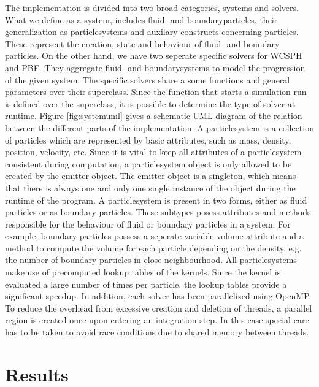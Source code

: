 \documentclass[11pt, letterpaper, twocolumn]{article}
\begin{document}
The implementation is divided into two broad categories, systems and solvers.
What we define as a system, includes fluid- and boundaryparticles, their generalization as particlesystems and auxilary constructs concerning particles. These represent the creation, state and behaviour of fluid- and boundary particles.
On the other hand, we have two seperate specific solvers for WCSPH and PBF. They aggregate fluid- and boundarysystems to model the progression of the given system. The specific solvers share a some functions and general parameters over their superclass. Since the function that starts a simulation run is defined over the superclass, it is possible to determine the type of solver at runtime.
Figure \ref{fig:systemuml} gives a schematic UML diagram of the relation between the different parts of the implementation.
A particlesystem is a collection of particles which are represented by basic attributes, such as mass, density, position, velocity, etc. Since it is vital to keep all attributes of a particlesystem consistent during computation, a particlesystem object is only allowed to be created by the emitter object. The emitter object is a singleton, which means that there is always one and only one single instance of the object during the runtime of the program. A particlesystem is present in two forms, either as fluid particles or as boundary particles. These subtypes posess attributes and methods responsible for the behaviour of fluid or boundary particles in a system. For example, boundary particles possess a seperate variable volume attribute and a method to compute the volume for each particle depending on the density, e.g. the number of boundary particles in close neighbourhood. All particlesystems make use of precomputed lookup tables of the kernels. Since the kernel is evaluated a large number of times per particle, the lookup tables provide a significant speedup.
In addition, each solver has been parallelized using OpenMP. To reduce the overhead from excessive creation and deletion of threads, a parallel region is created once upon entering an integration step. In this case special care has to be taken to avoid race conditions due to shared memory between threads. 

\section{Results}
\label{sec:results}
\end{document}
